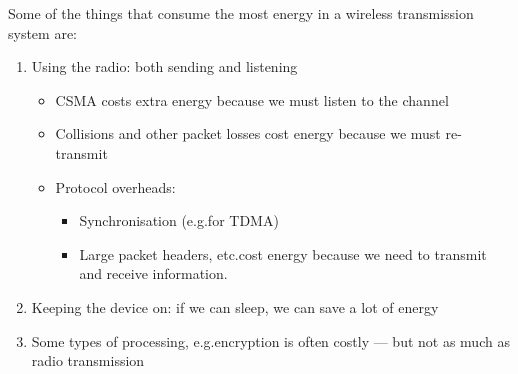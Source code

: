 Some of the things that consume the most energy in a wireless transmission system are:
\begin{enumerate}[noitemsep]
\item Using the radio: both sending and listening
  \begin{itemize}[noitemsep]
  \item CSMA costs extra energy because we must listen to the channel
  \item Collisions and other packet losses cost energy because we must re-transmit
  \item Protocol overheads:
    \begin{itemize}[noitemsep]
    \item Synchronisation (e.g.\@ for TDMA)
    \item Large packet headers, etc.\@ cost energy because we need to transmit and receive information.
    \end{itemize}
  \end{itemize}

\item Keeping the device on: if we can sleep, we can save a lot of
  energy
\item Some types of processing, e.g.\@ encryption is often costly --- but not as much as radio transmission
\end{enumerate}


